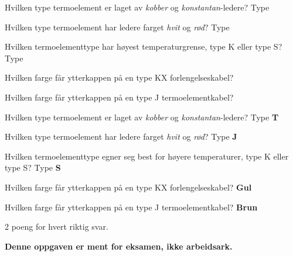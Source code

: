 

Hvilken type termoelement er laget av {\it kobber} og {\it konstantan}-ledere? Type \underbar{\hskip 50pt}

\vskip 10pt

Hvilken type termoelement har ledere farget {\it hvit} og {\it rød}? Type \underbar{\hskip 50pt}

\vskip 10pt

Hvilken termoelementtype har høyest temperaturgrense, type K eller type S? Type \underbar{\hskip 50pt}

\vskip 10pt

Hvilken farge får ytterkappen på en type KX forlengelseskabel? \underbar{\hskip 50pt}

\vskip 10pt

Hvilken farge får ytterkappen på en type J termoelementkabel? \underbar{\hskip 50pt}







Hvilken type termoelement er laget av {\it kobber} og {\it konstantan}-ledere? Type {\bf T}

\vskip 10pt

Hvilken type termoelement har ledere farget {\it hvit} og {\it rød}? Type {\bf J}

\vskip 10pt

Hvilken termoelementtype egner seg best for høyere temperaturer, type K eller type S? Type {\bf S}

\vskip 10pt

Hvilken farge får ytterkappen på en type KX forlengelseskabel? {\bf Gul}

\vskip 10pt

Hvilken farge får ytterkappen på en type J termoelementkabel? {\bf Brun}

\vskip 10pt

2 poeng for hvert riktig svar.







{\bf Denne oppgaven er ment for eksamen, ikke arbeidsark.}


